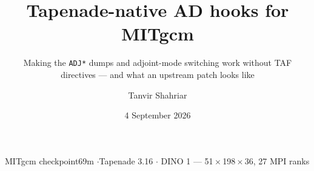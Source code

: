 \documentclass[10pt,aspectratio=169]{beamer}
\title{Tapenade-native AD hooks for MITgcm}
\subtitle{Making the \texttt{ADJ*} dumps and adjoint-mode switching work
          without TAF directives --- and what an upstream patch looks like}
\author{Tanvir Shahriar}
\date{4 September 2026}
\begin{document}
\begin{frame}[plain]
  \titlepage
  \vspace{-1.2em}
  \begin{center}
    \footnotesize\color{ImpSlate}
    MITgcm checkpoint69m \quad$\cdot$\quad Tapenade 3.16 \quad$\cdot$\quad
    DINO 1\textdegree{} --- 51\,$\times$\,198\,$\times$\,36, 27 MPI ranks
  \end{center}
\end{frame}




\end{document}
